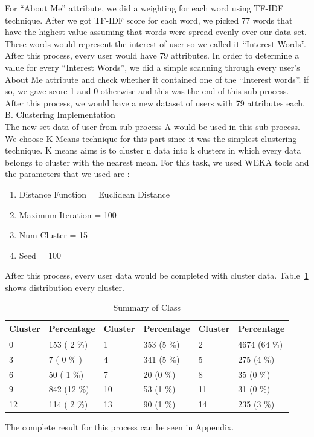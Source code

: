 For “About Me” attribute, we did a weighting for each word using TF-IDF technique. After we got TF-IDF score for each word, we picked 77 words that have the highest value assuming that words were spread evenly over our data set. These words would represent the interest of user so we called it “Interest Words”. After this process, every user would have 79 attributes. In order to determine a value for every “Interest Words”, we did a simple scanning through every user’s About Me attribute and check whether it contained one of the “Interest words”.  if so, we gave score 1 and 0 otherwise and this was the end of this sub process.  After this process, we would have a new dataset of users with 79 attributes each.  \\

B. Clustering Implementation \\
The new set data of user from sub process A would be used in this sub process. We choose K-Means technique for this part since it was the simplest clustering technique. K means aims is to cluster n data into k clusters in which every data belongs to cluster with the nearest mean. For this task, we used WEKA tools and the parameters that we used are :\\
\begin{enumerate}
	\item Distance Function = Euclidean Distance
	\item Maximum Iteration = 100
	\item Num Cluster       = 15
	\item Seed              = 100
\end{enumerate}
After this process, every user data would be completed with cluster data.  Table~\ref{percentageuser} shows  distribution every cluster. \\
\begin{table}[H]
 \centering
    \begin{tabular}{|l|l|l|l|l|l|}
    \hline
    Cluster & Percentage  & Cluster & Percentage & Cluster & Percentage  \\ \hline
    0       & 153 ( 2 \%)  & 1       & 353 (5 \%)  & 2       & 4674 (64 \%) \\ \hline
    3       & 7 ( 0 \% )   & 4       & 341 (5 \%)  & 5       & 275 (4 \%)   \\ \hline
    6       & 50 ( 1 \%)   & 7       & 20 (0 \%)   & 8       & 35 (0 \%)    \\ \hline
    9       & 842 (12 \%)  & 10      & 53 (1 \%)   & 11      & 31 (0 \%)    \\ \hline
    12      & 114 ( 2 \%)  & 13      & 90 (1 \%)   & 14      & 235 (3 \%)   \\ \hline
    \end{tabular}
    \caption {Summary of Class}
    \label{percentageuser}
\end{table}
The complete result for this process can be seen in Appendix. \\

